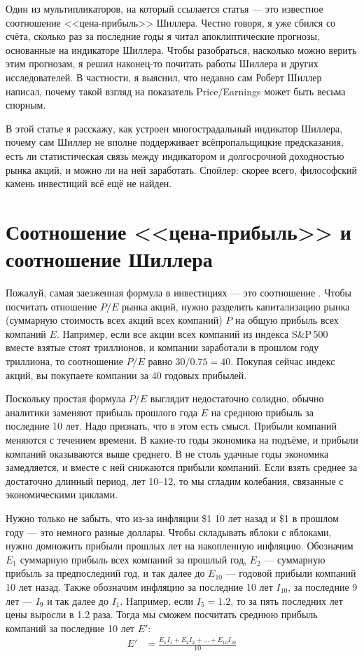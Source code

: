Один из мультипликаторов, на который ссылается статья --- это известное соотношение <<цена-прибыль>> Шиллера. Честно говоря, я уже сбился со счёта, сколько раз за последние годы я читал апоклиптические прогнозы, основанные на индикаторе Шиллера. Чтобы разобраться, насколько можно верить этим прогнозам, я решил наконец-то почитать работы Шиллера и других исследователей. В частности, я выяснил, что недавно сам Роберт Шиллер написал, почему такой взгляд на показатель Price/Earnings может быть весьма спорным.

В этой статье я расскажу, как устроен многострадальный индикатор Шиллера, почему сам Шиллер не вполне поддерживает всёпропальщицкие предсказания, есть ли статистическая связь между индикатором и долгосрочной доходностью рынка акций, и можно ли на ней заработать. Спойлер: скорее всего, философский камень инвестиций всё ещё не найден.

\section*{Соотношение <<цена-прибыль>> и соотношение Шиллера}

Пожалуй, самая заезженная формула в инвестициях --- это соотношение . Чтобы посчитать отношение $P/E$ рынка акций, нужно разделить капитализацию рынка (суммарную стоимость всех акций всех компаний) $P$ на общую прибыль всех компаний $E$. Например, если все акции всех компаний из индекса S\&P\,500 вместе взятые стоят  триллионов, и компании заработали в прошлом году  триллиона, то соотношение $P/E$ равно $30/0.75 = 40$. Покупая сейчас индекс акций, вы покупаете компании за 40 годовых прибылей.

Поскольку простая формула $P/E$ выглядит недостаточно солидно, обычно аналитики заменяют прибыль прошлого года $E$ на среднюю прибыль за последние 10 лет. Надо признать, что в этом есть смысл. Прибыли компаний меняются с течением времени. В какие-то годы экономика на подъёме, и прибыли компаний оказываются выше среднего. В не столь удачные годы экономика замедляется, и вместе с ней снижаются прибыли компаний. Если взять среднее за достаточно длинный период, лет 10--12, то мы сгладим колебания, связанные с экономическими циклами.

Нужно только не забыть, что из-за инфляции \$1 10 лет назад и \$1 в прошлом году --- это немного разные доллары. Чтобы складывать яблоки с яблоками, нужно домножить прибыли прошлых лет на накопленную инфляцию. Обозначим $E_{1}$ суммарную прибыль всех компаний за прошлый год, $E_2$ --- суммарную прибыль за предпоследний год, и так далее до $E_{10}$ --- годовой прибыли компаний 10 лет назад. Также обозначим инфляцию за последние 10 лет $I_{10}$, за последние 9 лет --- $I_9$ и так далее до $I_1$. Например, если $I_5=1.2$, то за пять последних лет цены выросли в 1.2 раза. Тогда мы сможем посчитать среднюю прибыль компаний за последние 10 лет  $E'$:
\begin{align*}
E' &= \frac{E_1I_1 + E_2I_2 + ... + E_{10}I_{10}}{10}
\end{align*}

